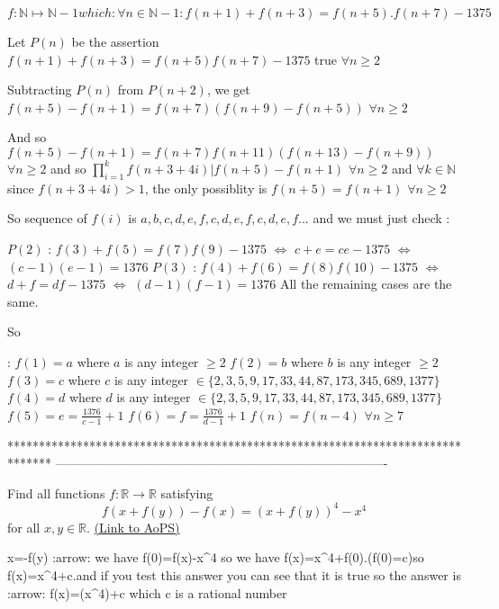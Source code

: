 \begin{solution}
	\begin{tcolorbox}\[f:\mathbb{N} \mapsto \mathbb{N}-{1} which:
\forall n
\in \mathbb {N}-{1}:f(n+1)+f(n+3)=f(n+5).f(n+7)-1375\]\end{tcolorbox}
Let $P(n)$ be the assertion $f(n+1)+f(n+3)=f(n+5)f(n+7)-1375$ true $\forall n\ge 2$

Subtracting $P(n)$ from $P(n+2)$, we get $f(n+5)-f(n+1)=f(n+7)(f(n+9)-f(n+5))$ $\forall n\ge 2$

And so $f(n+5)-f(n+1)=f(n+7)f(n+11)(f(n+13)-f(n+9))$ $\forall n\ge 2$
and so $\prod_{i=1}^kf(n+3+4i)|f(n+5)-f(n+1)$ $\forall n\ge 2$ and $\forall k\in\mathbb N$
since $f(n+3+4i)>1$, the only possiblity is $f(n+5)=f(n+1)$ $\forall n\ge 2$

So sequence of $f(i)$ is $a,b,c,d,e,f,c,d,e,f,c,d,e,f...$ and we must just check :

$P(2)$ : $f(3)+f(5)=f(7)f(9)-1375$ $\iff$ $c+e=ce-1375$ $\iff$ $(c-1)(e-1)=1376$
$P(3)$ : $f(4)+f(6)=f(8)f(10)-1375$ $\iff$ $d+f=df-1375$ $\iff$ $(d-1)(f-1)=1376$
All the remaining cases are the same.

So  :
$f(1)=a$ where $a$ is any integer $\ge 2$
$f(2)=b$ where $b$ is any integer $\ge 2$
$f(3)=c$ where $c$ is any integer $\in\{2,3,5,9,17,33,44,87,173,345,689,1377\}$
$f(4)=d$ where $d$ is any integer $\in\{2,3,5,9,17,33,44,87,173,345,689,1377\}$
$f(5)=e=\frac{1376}{c-1}+1$
$f(6)=f=\frac{1376}{d-1}+1$
$f(n)=f(n-4)$ $\forall n\ge 7$
\end{solution}
*******************************************************************************
-------------------------------------------------------------------------------

\begin{problem}
	Find all functions $f: \mathbb{R} \to \mathbb{R}$ satisfying
\[f(x+f(y))-f(x)=(x+f(y))^4-x^4\]
for all $x,y \in \mathbb{R}$.
	\flushright \href{https://artofproblemsolving.com/community/c6h529313}{(Link to AoPS)}
\end{problem}



\begin{solution}
	x=-f(y) :arrow:  we have f(0)=f(x)-x^4 so we have f(x)=x^4+f(0).(f(0)=c)so f(x)=x^4+c.and if you test this answer you can see that it is true so the answer is :arrow:  f(x)=(x^4)+c which c is a rational number
\end{solution}



